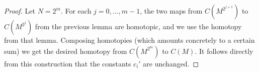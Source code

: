\begin{proof} Let $N=2^m$. For each $j=0,\ldots,m-1$, the two maps from $C(M^{2^{j+1}})$ to $C(M^{2^j})$ from the previous lemma are homotopic, and we use the homotopy from that lemma. Composing homotopies (which amounts concretely to a certain sum) we get the desired homotopy from $C(M^{2^m})$ to $C(M)$. It follows directly from this construction that the constants $c_i'$ are unchanged.
\end{proof}
